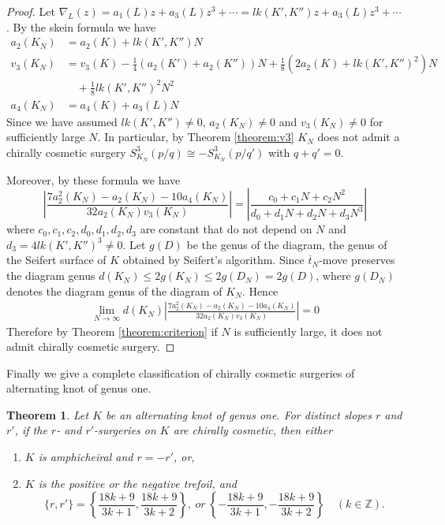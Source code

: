 \documentclass{amsart}
\newtheorem{theorem}{Theorem}[section]
\theoremstyle{remark}
\theoremstyle{definition}
\begin{document}
\begin{proof}
Let $\nabla_{L}(z)=a_1(L)z +a_3(L)z^{3}+\cdots = lk(K',K'')z +a_3(L)z^{3}+\cdots$.
By the skein formula we have  
\begin{align*}
a_2(K_N) & =a_2(K)+ lk(K',K'')N\\
v_3(K_N) &= v_3(K) - \frac{1}{4}(a_2(K')+a_2(K''))N + \frac{1}{8}\left(2 a_2(K) +lk(K',K'')^{2} \right)N \\
& \quad+ \frac{1}{8}lk(K',K'')^{2}N^{2}\\
a_4(K_N) &=a_4(K) + a_3(L) N 
\end{align*}
Since we have assumed $lk(K',K'')\neq 0$, $a_2(K_N) \neq 0$ and $v_3(K_N)\neq 0$ for sufficiently large $N$. In particular, by Theorem \ref{theorem:v3} $K_N$ does not admit a chirally cosmetic surgery $S^{3}_{K_N}(p/q)\cong -S^{3}_{K_N}(p/q')$ with $q+q'=0$.

Moreover, by these formula we have 
\[ \left| \frac{7a_2^{2}(K_N)-a_2(K_N)-10a_4(K_N)}{32 a_{2}(K_N)v_3(K_N)} \right| = 
 \left| \frac{c_0+c_1 N+ c_2N^{2}}{d_0+d_1N + d_2N + d_3N^{3}} \right|\]
where $c_0,c_1,c_2,d_0,d_1,d_2,d_3$ are constant that do not depend on $N$ and $d_3=4 lk(K',K'')^{3} \neq 0$. 
Let $g(D)$ be the genus of the diagram, the genus of the Seifert surface of $K$ obtained by Seifert's algorithm. Since $\overline{t}_{N}$-move preserves the diagram genus $d(K_N) \leq 2g(K_N) \leq 2g(D_N) = 2g(D)$, where $g(D_N)$ denotes the diagram genus of the diagram of $K_N$. Hence
\begin{align*}
\lim_{N\to \infty} d(K_N) \left| \frac{7a_2^{2}(K_N)-a_2(K_N)-10a_4(K_N)}{32 a_{2}(K_N)v_3(K_N)} \right| = 0
\end{align*}
Therefore by Theorem \ref{theorem:criterion} if $N$ is sufficiently large, it does not admit chirally cosmetic surgery.
\end{proof}


Finally we give a complete classification of chirally cosmetic surgeries of alternating knot of genus one.

\begin{theorem}
\label{theorem:main-genus-one-alternating}
Let $K$ be an alternating knot of genus one. 
For distinct slopes $r$ and $r'$, if the $r$- and $r'$-surgeries on $K$ are chirally cosmetic, 
then either
\begin{enumerate}
\item[(i)] $K$ is amphicheiral and $r=-r'$, or,
\item[(ii)] $K$ is the positive or the negative trefoil, and 
\[ \{r,r'\} = 
\left\{\frac{18k+9}{3k+1}, \frac{18k+9}{3k+2} \right\},\ \mathit{or}\ 
\left\{- \frac{18k+9}{3k+1}, - \frac{18k+9}{3k+2} \right\} \quad (k \in \mathbb{Z}).\]
\end{enumerate}
\end{theorem}
\end{document}
